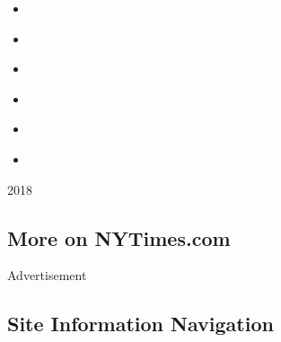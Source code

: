 \begin{itemize}
\tightlist
\item
  \href{https://www.nytimes3xbfgragh.onion/interactive/2018/10/03/magazine/lady-gaga-movie-star-is-born.html}{}
\item
  \href{https://www.nytimes3xbfgragh.onion/interactive/2018/10/03/magazine/morality-social-justice-art-entertainment.html}{}
\item
  \href{https://www.nytimes3xbfgragh.onion/interactive/2018/10/04/magazine/good-place-michael-schur-philosophy.html}{}
\item
  \href{https://www.nytimes3xbfgragh.onion/interactive/2018/10/04/magazine/barry-jenkins-james-baldwin-if-beale-street-could-talk.html}{}
\item
  \href{https://www.nytimes3xbfgragh.onion/interactive/2018/10/05/magazine/instagram-cindy-sherman-ugly-beauty.html}{}
\item
  \href{https://www.nytimes3xbfgragh.onion/interactive/2018/10/05/magazine/culture-moments-2018.html}{}
\end{itemize}

2018

\hypertarget{more-on-nytimescom}{%
\subsection{More on NYTimes.com}\label{more-on-nytimescom}}

Advertisement

\hypertarget{site-information-navigation}{%
\subsection{Site Information
Navigation}\label{site-information-navigation}}

